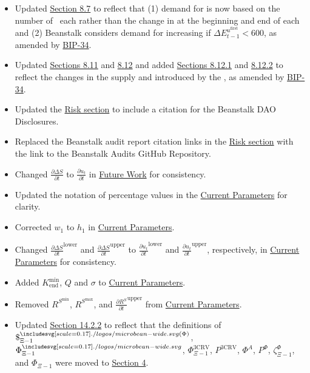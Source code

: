 \documentclass[class=article, crop=false]{standalone}
\begin{document}
\begin{itemize}[topsep=0pt, itemsep=3pt,leftmargin=16pt]
\begin{itemize}
        \item Updated \hyperlink{subsection.8.7}{Section 8.7} to reflect that (1) demand for  is now based on the number of  \Bean\ each  rather than the change in  at the beginning and end of each  and (2) Beanstalk considers demand for  increasing if $\Delta E_{t-1}^{u^{\text{first}}} < 600$, as amended by \href{https://bean.money/bip-34}{BIP-34}.
        \item Updated \hyperlink{subsection.8.11}{Sections 8.11} and \hyperlink{subsection.8.12}{8.12} and added \hyperlink{subsubsection.8.12.2}{Sections 8.12.1} and \hyperlink{subsubsection.8.12.2}{8.12.2} to reflect the changes in the  supply and  introduced by the , as amended by \href{https://bean.money/bip-34}{BIP-34}.
        \item Updated the \hyperlink{section.12}{Risk section} to include a citation for the Beanstalk DAO Disclosures.
        \item Replaced the Beanstalk audit report citation links in the \hyperlink{section.12}{Risk section} with the link to the Beanstalk Audits GitHub Repository.
        \item Changed $\frac{\partial \Delta S}{\partial t}$ to $\frac{\partial u_t}{\partial t}$ in \hyperlink{section.13}{Future Work} for consistency.
        \item Updated the notation of percentage values in the \hyperlink{subsection.14.1}{Current Parameters} for clarity.
        \item Corrected $w_1$ to $h_1$ in \hyperlink{subsection.14.1}{Current Parameters}.
        \item Changed $\frac{\partial \Delta S}{\partial t}^{\text{lower}}$ and $\frac{\partial \Delta S}{\partial t}^{\text{upper}}$ to $\frac{\partial u_t}{\partial t}^{\text{lower}}$ and $\frac{\partial u_t}{\partial t}^{\text{upper}}$, respectively, in \hyperlink{subsection.14.1}{Current Parameters} for consistency.
        \item Added $K_{\text{end}}^{\text{min}}$, $Q$ and $\sigma$ to \hyperlink{subsection.14.1}{Current Parameters}.
        \item Removed $R^{S^{\text{min}}}$, $R^{S^{\text{max}}}$, and $\frac{\partial R^S}{\partial t}^{\text{upper}}$ from \hyperlink{subsection.14.1}{Current Parameters}.
        \item Updated \hyperlink{subsubsection.14.2.2}{Section 14.2.2} to reflect that the definitions of \hyperlink{ht3}{$\$^{\bean(\Phi)}_{\Xi-1}$}, \hyperlink{ht193}{$\Phi_{\Xi-1}^{\bean}$}, \hyperlink{ht194}{$\Phi_{\Xi-1}^{\text{3CRV}}$}, \hyperlink{ht136}{$P^{\text{3CRV}}$}, \hyperlink{ht190}{$\Phi^{A}$}, \hyperlink{ht140}{$P^{\Phi}$}, \hyperlink{ht96}{$\zeta^{\Phi}_{\Xi-1}$}, and \hyperlink{ht192}{$\Phi_{\Xi-1}$} were moved to \hyperlink{section.4}{Section 4}.

\end{itemize}
\end{itemize}
\end{document}
